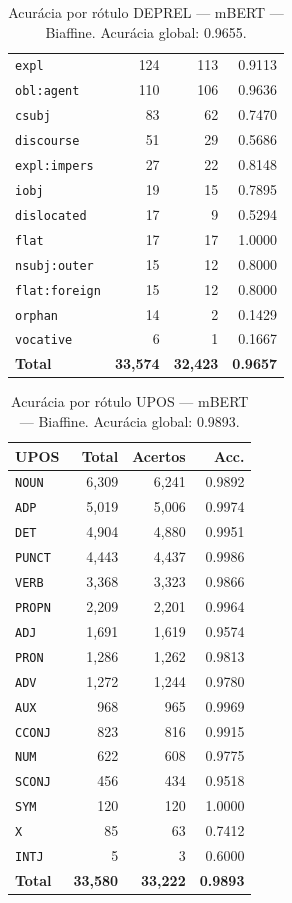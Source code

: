 \begin{table}[ht]
\begin{tabular}{lrrr}
\texttt{expl} & 124 & 113 & 0.9113 \\
\texttt{obl\!:\!agent} & 110 & 106 & 0.9636 \\
\texttt{csubj} & 83 & 62 & 0.7470 \\
\texttt{discourse} & 51 & 29 & 0.5686 \\
\texttt{expl\!:\!impers} & 27 & 22 & 0.8148 \\
\texttt{iobj} & 19 & 15 & 0.7895 \\
\texttt{dislocated} & 17 & 9 & 0.5294 \\
\texttt{flat} & 17 & 17 & 1.0000 \\
\texttt{nsubj\!:\!outer} & 15 & 12 & 0.8000 \\
\texttt{flat\!:\!foreign} & 15 & 12 & 0.8000 \\
\texttt{orphan} & 14 & 2 & 0.1429 \\
\texttt{vocative} & 6 & 1 & 0.1667 \\
\midrule
\textbf{Total} & \textbf{33,574} & \textbf{32,423} & \textbf{0.9657} \\
\bottomrule
\end{tabular}
\caption{Acurácia por rótulo DEPREL — mBERT — Biaffine. Acurácia global: 0.9655.}
\label{tab:deprel-acc-predict-test-df-mbert-biaffine}
\end{table}

\begin{table}[ht]
\centering
\footnotesize
\begin{tabular}{lrrr}
\toprule
\textbf{UPOS} & \textbf{Total} & \textbf{Acertos} & \textbf{Acc.} \\
\midrule
\texttt{NOUN} & 6,309 & 6,241 & 0.9892 \\
\texttt{ADP} & 5,019 & 5,006 & 0.9974 \\
\texttt{DET} & 4,904 & 4,880 & 0.9951 \\
\texttt{PUNCT} & 4,443 & 4,437 & 0.9986 \\
\texttt{VERB} & 3,368 & 3,323 & 0.9866 \\
\texttt{PROPN} & 2,209 & 2,201 & 0.9964 \\
\texttt{ADJ} & 1,691 & 1,619 & 0.9574 \\
\texttt{PRON} & 1,286 & 1,262 & 0.9813 \\
\texttt{ADV} & 1,272 & 1,244 & 0.9780 \\
\texttt{AUX} & 968 & 965 & 0.9969 \\
\texttt{CCONJ} & 823 & 816 & 0.9915 \\
\texttt{NUM} & 622 & 608 & 0.9775 \\
\texttt{SCONJ} & 456 & 434 & 0.9518 \\
\texttt{SYM} & 120 & 120 & 1.0000 \\
\texttt{X} & 85 & 63 & 0.7412 \\
\texttt{INTJ} & 5 & 3 & 0.6000 \\
\midrule
\textbf{Total} & \textbf{33,580} & \textbf{33,222} & \textbf{0.9893} \\
\bottomrule
\end{tabular}
\caption{Acurácia por rótulo UPOS — mBERT — Biaffine. Acurácia global: 0.9893.}
\label{tab:upos-acc-predict-test-df-mbert-biaffine}
\end{table}


